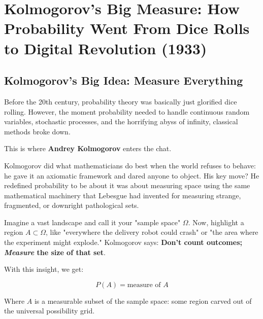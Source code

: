 \section{Kolmogorov's Big Measure: How Probability Went From Dice Rolls to Digital Revolution (1933)}



\subsection{Kolmogorov's Big Idea: Measure Everything}

Before the 20th century, probability theory was basically just glorified dice rolling. However, the moment probability needed to handle continuous random variables, stochastic processes, and the horrifying abyss of infinity, classical methods broke down. 

This is where \textbf{Andrey Kolmogorov} enters the chat. 

Kolmogorov did what mathematicians do best when the world refuses to behave: he gave it an axiomatic framework and dared anyone to object. His key move? He redefined probability to be about it was about measuring space using the same mathematical machinery that Lebesgue had invented for measuring strange, fragmented, or downright pathological sets.

Imagine a vast landscape and call it your "sample space" \( \Omega \). Now, highlight a region \( A \subset \Omega \), like "everywhere the delivery robot could crash" or "the area where the experiment might explode." Kolmogorov says: \textbf{Don’t count outcomes; \textit{Measure} the size of that set}. 

With this insight, we get:

\[
P(A) = \text{measure of } A
\]

Where \( A \) is a measurable subset of the sample space: some region carved out of the universal possibility grid. 

